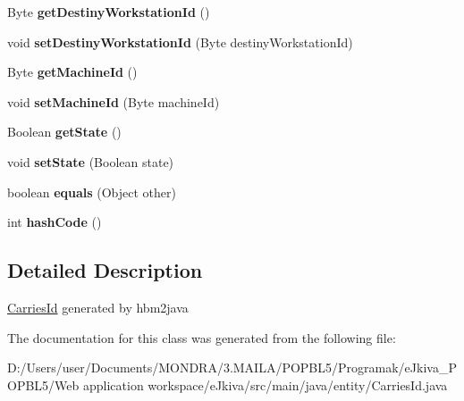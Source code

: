 \begin{DoxyCompactItemize}
Byte {\bfseries get\+Destiny\+Workstation\+Id} ()
\item 
\mbox{\label{classentity_1_1_carries_id_af9516f9d5e88954e3e72457f2ccf4f7b}} 
void {\bfseries set\+Destiny\+Workstation\+Id} (Byte destiny\+Workstation\+Id)
\item 
\mbox{\label{classentity_1_1_carries_id_a625fe262ed6c802bc07f9f4cc4a989bb}} 
Byte {\bfseries get\+Machine\+Id} ()
\item 
\mbox{\label{classentity_1_1_carries_id_aa5bba6ca3cb097ea91354987f1b6a2f0}} 
void {\bfseries set\+Machine\+Id} (Byte machine\+Id)
\item 
\mbox{\label{classentity_1_1_carries_id_a123b2805042dd0fe551c2e766b961129}} 
Boolean {\bfseries get\+State} ()
\item 
\mbox{\label{classentity_1_1_carries_id_a8f8f0f103d2fd8db15b6416370d690e1}} 
void {\bfseries set\+State} (Boolean state)
\item 
\mbox{\label{classentity_1_1_carries_id_ac343763b0821ae53aa653fc269cb0172}} 
boolean {\bfseries equals} (Object other)
\item 
\mbox{\label{classentity_1_1_carries_id_a2d5ebee74ab620ab24e2ab3da501cfd9}} 
int {\bfseries hash\+Code} ()
\end{DoxyCompactItemize}


\subsection{Detailed Description}
\mbox{\hyperlink{classentity_1_1_carries_id}{Carries\+Id}} generated by hbm2java 

The documentation for this class was generated from the following file\+:\begin{DoxyCompactItemize}
\item 
D\+:/\+Users/user/\+Documents/\+M\+O\+N\+D\+R\+A/3.\+M\+A\+I\+L\+A/\+P\+O\+P\+B\+L5/\+Programak/e\+Jkiva\+\_\+\+P\+O\+P\+B\+L5/\+Web application workspace/e\+Jkiva/src/main/java/entity/Carries\+Id.\+java\end{DoxyCompactItemize}

